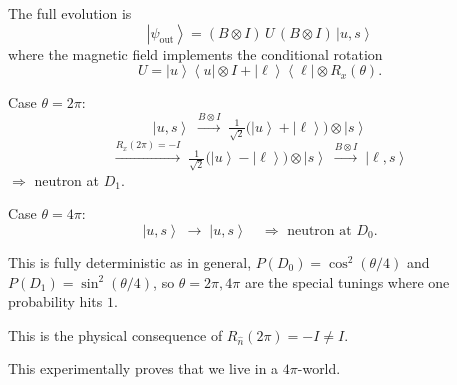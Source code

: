 \documentclass[
]{article}
\providecommand{\ket}[1]{\left\lvert #1 \right\rangle}
\providecommand{\bra}[1]{\left\langle #1 \right\rvert}
\begin{document}
The full evolution is
\[
	\ket{\psi_{\text{out}}} = (B \otimes I)\, U\, (B \otimes I)\, \ket{u, s}
\]
where the magnetic field implements the conditional rotation
\[
	U = \ket{u}\bra{u} \otimes I + \ket{\ell}\bra{\ell} \otimes R_x(\theta).
\]

Case $\theta = 2\pi$:
\[
	\ket{u, s} \;\xrightarrow{B \otimes I}\; \tfrac{1}{\sqrt{2}}\bigl(\ket{u} + \ket{\ell}\bigr) \otimes \ket{s}
\]
\[
	\xrightarrow{R_x(2\pi) = -I}\; \tfrac{1}{\sqrt{2}}\bigl(\ket{u} - \ket{\ell}\bigr) \otimes \ket{s}
	\;\xrightarrow{B \otimes I}\; \ket{\ell, s}
\]
$\Rightarrow$ neutron at $D_1$.

Case $\theta = 4\pi$:
\[
	\ket{u, s} \;\longrightarrow\; \ket{u, s} \quad\Rightarrow\text{ neutron at } D_0.
\]

This is fully deterministic as in general, $P(D_0) = \cos^2(\theta/4)$ and $P(D_1) = \sin^2(\theta/4)$, so $\theta = 2\pi, 4\pi$ are the special tunings where one probability hits $1$.

This is the physical consequence of $R_{\hat{n}}(2\pi) = -I \neq I$.

This experimentally proves that we live in a $4\pi$-world.

\newpage
{}
\end{document}
